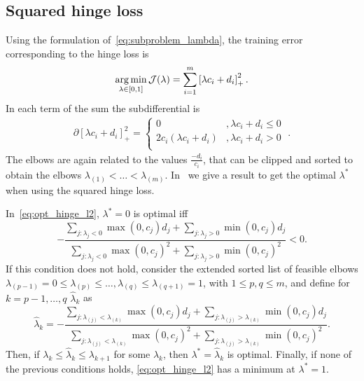 \subsection{Squared hinge loss}
Using the formulation of~\eqref{eq:subproblem_lambda}, the training error corresponding to the hinge loss is
\begin{equation}
    \label{eq:opt_hinge_l2}
    \argmin_{\lambda \in [0, 1]} \mathcal{J}(\lambda) = \sum_{i=1}^{\npertask} \pospart{\lambda c_i + d_i}^2.
\end{equation}
In each term of the sum the subdifferential is 
\begin{align*}
    \partial \left[\lambda c_i + d_i \right]_+^2 = 
    \begin{cases}
        0 &, \lambda c_i + d_i  \leq 0 \\
        2 c_i (\lambda c_i + d_i) &, \lambda c_i + d_i  > 0 \\
    \end{cases} \; .
\end{align*}
The elbows are again related to the values $\frac{-d_i}{c_i}$, that can be clipped and sorted to obtain the elbows ${\lambda}_{(1)} < \ldots < {\lambda}_{(m)}$.
In~\citet[Proposition 2]{RuizAD21} we give a result to get the optimal $\lambda^*$ when using the squared hinge loss.
\begin{prop}\label{prop:sqhinge_neurocom2020}
    In~\eqref{eq:opt_hinge_l2},
    $\lambda^*=0$ is optimal iff 
    \begin{equation}\nonumber
         - \frac{\sum_{j: \lambda_{j} < 0} \max(0, c_{j}) d_{j} + \sum_{j: \lambda_{j} > 0} \min(0, c_{j}) d_{j}}{\sum_{j: \lambda_{j} < 0} \max(0, c_{j})^2 + \sum_{j: \lambda_{j} > 0} \min(0, c_{j})^2} < 0.
       \end{equation}
    If this condition does not hold, 
    consider the extended sorted list of feasible elbows $\lambda_{(p-1)} = 0 \leq \lambda_{(p)} \leq \ldots, \lambda_{(q)} \leq \lambda_{(q+1)}=1$, with $1 \leq p, q \leq m$, and
    define for $k=p-1, \ldots,  q$ $\widehat{\lambda}_k$ as %
\begin{equation}\label{sol_hinge_2}
 \widehat{\lambda}_k = - \frac{\sum_{j: \lambda_{(j)} < \lambda_{(k)}} \max(0, c_{j}) d_{j} + \sum_{j: \lambda_{(j)} > \lambda_{(k)}} \min(0, c_{j}) d_{j}}{\sum_{j: \lambda_{(j)} < \lambda_{(k)}} \max(0, c_{j})^2 + \sum_{j: \lambda_{(j)} > \lambda_{(k)}} \min(0, c_{j})^2} .
\end{equation}
%
Then, if $\lambda_k \leq \widehat{\lambda}_k \leq  \lambda_{k+1}$ for some $\widehat{\lambda}_k$, then $\lambda^* = \widehat{\lambda}_k$ is optimal.
Finally, if none of the previous conditions holds, \eqref{eq:opt_hinge_l2} has a minimum at $\lambda^* = 1$.
\end{prop}


